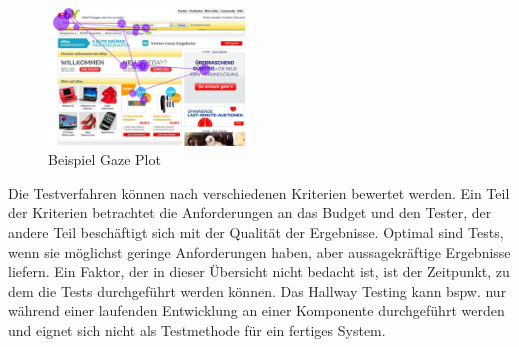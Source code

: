 \begin{figure}[H]
 \centering
 \includegraphics[width=0.48\textwidth]{grafiken/gaze_plot.png}
 \caption[Beispiel Gaze Plot]{Beispiel Gaze Plot \cite{Henrici2010}}
 \label{fig:gazePlot}
\end{figure}
Die Testverfahren können nach verschiedenen Kriterien bewertet werden. Ein Teil der Kriterien betrachtet die Anforderungen an das Budget und den Tester, der andere Teil beschäftigt sich mit der Qualität der Ergebnisse. Optimal sind Tests, wenn sie möglichst geringe Anforderungen haben, aber aussagekräftige Ergebnisse liefern. Ein Faktor, der in dieser Übersicht nicht bedacht ist, ist der Zeitpunkt, zu dem die Tests durchgeführt werden können. Das Hallway Testing kann bspw. nur während einer laufenden Entwicklung an einer Komponente durchgeführt werden und eignet sich nicht als Testmethode für ein fertiges System.

